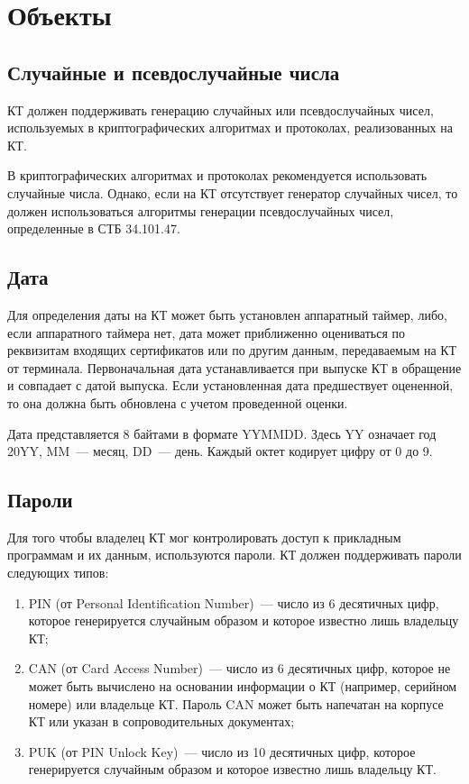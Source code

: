 \section{Объекты}\label{OBJ}

\subsection{Случайные и псевдослучайные числа}\label{OBJ.RNG}

КТ должен поддерживать генерацию случайных или псевдослучайных чисел, 
используемых в криптографических алгоритмах и протоколах, реализованных на 
КТ. 

В криптографических алгоритмах и протоколах рекомендуется использовать 
случайные числа. Однако, если на КТ отсутствует генератор случайных чисел, 
то должен использоваться алгоритмы генерации псевдослучайных чисел, 
определенные в СТБ 34.101.47.

\subsection{Дата}\label{OBJ.Date}

Для определения даты на КТ может быть установлен аппаратный таймер, либо, 
если аппаратного таймера нет, дата может приближенно оцениваться по 
реквизитам входящих сертификатов или по другим данным, передаваемым на КТ 
от терминала. Первоначальная дата устанавливается при выпуске КТ в обращение и 
совпадает с датой выпуска. Если установленная дата предшествует оцененной, 
то она должна быть обновлена с учетом проведенной оценки. 

Дата представляется 8 байтами в формате YYMMDD. Здесь YY означает год 
20YY, MM~--- месяц, DD~--- день. Каждый октет кодирует цифру от 0 до 9. 

\subsection{Пароли}\label{OBJ.PWD}

Для того чтобы владелец КТ мог контролировать доступ к прикладным 
программам и их данным, используются пароли. КТ должен поддерживать пароли 
следующих типов: 

\begin{enumerate}
\item 
PIN (от Personal Identification Number)~--- 
число из 6 десятичных цифр, которое генерируется случайным образом и 
которое известно лишь владельцу КТ; 

\item 
CAN (от Card Access Number)~--- число из 6 десятичных цифр, 
которое не может быть вычислено на основании информации о КТ 
(например, серийном номере) или владельце КТ. Пароль CAN может быть 
напечатан на корпусе КТ или указан в сопроводительных документах; 

\item 
PUK (от PIN Unlock Key)~--– число из 10 десятичных цифр, 
которое генерируется случайным образом и которое известно лишь 
владельцу КТ. 
\end{enumerate}

